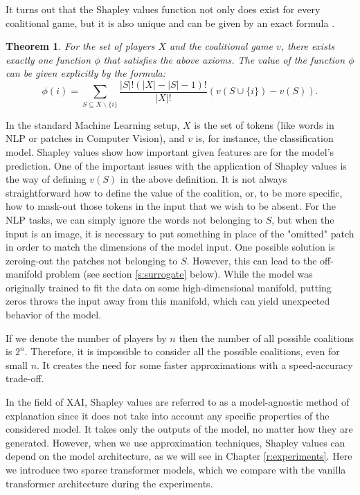 \documentclass[magisterska,en]{pracamgr}
\newtheorem{thm}{Theorem}[section]
\begin{document}
It turns out that the Shapley values function not only does exist for every coalitional game, but it is also unique and can be given by an exact formula \cite{ShapleyValues}.

\begin{thm}\label{shap_def}
  For the set of players $X$ and the coalitional game $v$, there exists exactly one function $\phi$ that satisfies the above axioms.
The value of the function $\phi$ can be given explicitly by the formula:
  \begin{equation*}
      \phi (i) = \sum_{S\subseteq X\backslash \{i\}} \frac{|S|!(|X|-|S|-1)!}{|X|!}\left(v(S \cup \{i\}) - v(S)\right).
  \end{equation*}
\end{thm}

In the standard Machine Learning setup, $X$ is the set of tokens (like words in NLP or patches in Computer Vision), and $v$ is, for instance, the classification model. Shapley values show how important given features are for the model's prediction. One of the important issues with the application of Shapley values is the way of defining $v(S)$ in the above definition. It is not always straightforward how to define the value of the coalition, or, to be more specific, how to mask-out those tokens in the input that we wish to be absent. For the NLP tasks, we can simply ignore the words not belonging to $S$, but when the input is an image, it is necessary to put something in place of the "omitted" patch in order to match the dimensions of the model input. One possible solution is zeroing-out the patches not belonging to $S$. However, this can lead to the off-manifold problem (see section \ref{s:surrogate} below). While the model was originally trained to fit the data on some high-dimensional manifold, putting zeros throws the input away from this manifold, which can yield unexpected behavior of the model.



If we denote the number of players by $n$ then the number of all possible coalitions is $2^n$. Therefore, it is impossible to consider all the possible coalitions, even for small $n$. It creates the need for some faster approximations with a speed-accuracy trade-off.


In the field of XAI, Shapley values are referred to as a model-agnostic method of explanation since it does not take into account any specific properties of the considered model. It takes only the outputs of the model, no matter how they are generated. However, when we use approximation techniques, Shapley values can depend on the model architecture, as we will see in Chapter \ref{r:experiments}. Here we introduce two sparse transformer models, which we compare with the vanilla transformer architecture during the experiments.
\end{document}

